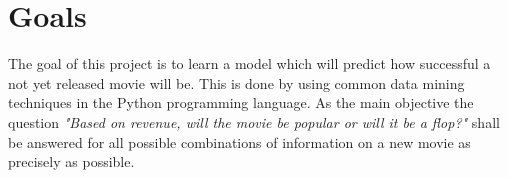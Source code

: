 \section{Goals}
The goal of this project is to learn a model which will predict how successful a not yet released movie will be. This is done by using common data mining techniques in the Python programming language. As the main objective the question \textit{"Based on revenue, will the movie be popular or will it be a flop?"} shall be answered for all possible combinations of information on a new movie as precisely as possible.








 
